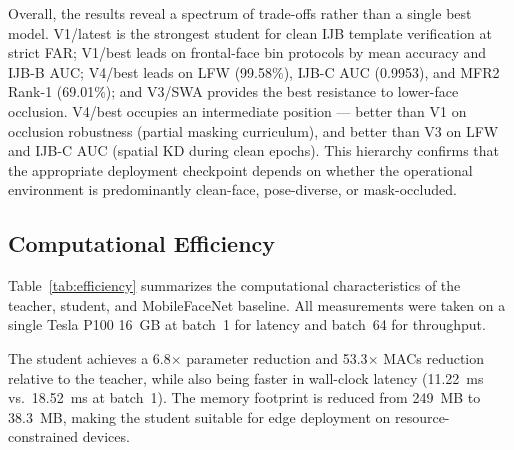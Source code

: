 Overall, the results reveal a spectrum of trade-offs rather than a single best model. V1/latest is the strongest student for clean IJB template verification at strict FAR; V1/best leads on frontal-face bin protocols by mean accuracy and IJB-B AUC; V4/best leads on LFW (99.58\%), IJB-C AUC (0.9953), and MFR2 Rank-1 (69.01\%); and V3/SWA provides the best resistance to lower-face occlusion. V4/best occupies an intermediate position — better than V1 on occlusion robustness (partial masking curriculum), and better than V3 on LFW and IJB-C AUC (spatial KD during clean epochs). This hierarchy confirms that the appropriate deployment checkpoint depends on whether the operational environment is predominantly clean-face, pose-diverse, or mask-occluded.

\subsection{Computational Efficiency}

Table~\ref{tab:efficiency} summarizes the computational characteristics of the teacher, student, and MobileFaceNet baseline. All measurements were taken on a single Tesla P100 16~GB at batch~1 for latency and batch~64 for throughput.

\begin{table}[h]
\centering
\caption{Computational efficiency comparison. Latency and throughput measured on Tesla P100.}
\label{tab:efficiency}
\end{table}

The student achieves a 6.8$\times$ parameter reduction and 53.3$\times$ MACs reduction relative to the teacher, while also being faster in wall-clock latency (11.22~ms vs.~18.52~ms at batch~1). The memory footprint is reduced from 249~MB to 38.3~MB, making the student suitable for edge deployment on resource-constrained devices.


